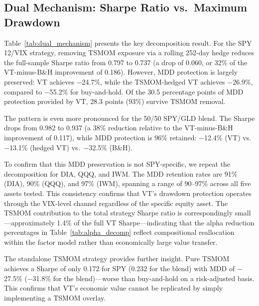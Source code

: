 \documentclass[12pt,a4paper]{article}
\begin{document}
\subsection{Dual Mechanism: Sharpe Ratio vs.\ Maximum Drawdown}

Table~\ref{tab:dual_mechanism} presents the key decomposition result. For the SPY 12/VIX strategy, removing TSMOM exposure via a rolling 252-day hedge reduces the full-sample Sharpe ratio from 0.797 to 0.737 (a drop of 0.060, or 32\% of the VT-minus-B\&H improvement of 0.186). However, MDD protection is largely preserved: VT achieves $-$24.7\%, while the TSMOM-hedged VT achieves $-$26.9\%, compared to $-$55.2\% for buy-and-hold. Of the 30.5 percentage points of MDD protection provided by VT, 28.3 points (93\%) survive TSMOM removal.

The pattern is even more pronounced for the 50/50 SPY/GLD blend. The Sharpe drops from 0.982 to 0.937 (a 38\% reduction relative to the VT-minus-B\&H improvement of 0.117), while MDD protection is 96\% retained: $-$12.4\% (VT) vs.\ $-$13.1\% (hedged VT) vs.\ $-$32.5\% (B\&H).

To confirm that this MDD preservation is not SPY-specific, we repeat the decomposition for DIA, QQQ, and IWM. The MDD retention rates are 91\% (DIA), 90\% (QQQ), and 97\% (IWM), spanning a range of 90--97\% across all five assets tested. This consistency confirms that VT's drawdown protection operates through the VIX-level channel regardless of the specific equity asset. The TSMOM contribution to the total strategy Sharpe ratio is correspondingly small---approximately 1.4\% of the full VT Sharpe---indicating that the alpha reduction percentages in Table~\ref{tab:alpha_decomp} reflect compositional reallocation within the factor model rather than economically large value transfer.

The standalone TSMOM strategy provides further insight. Pure TSMOM achieves a Sharpe of only 0.172 for SPY (0.232 for the blend) with MDD of $-$27.5\% ($-$31.8\% for the blend)---worse than buy-and-hold on a risk-adjusted basis. This confirms that VT's economic value cannot be replicated by simply implementing a TSMOM overlay.
\end{document}
